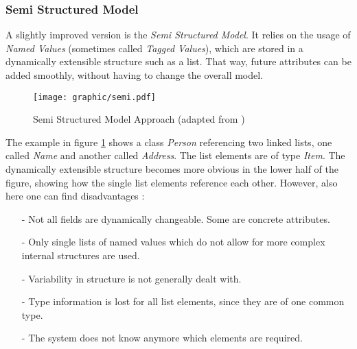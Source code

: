 %
%
%
%
%
%
%

\subsubsection{Semi Structured Model}
\label{semi_structured_model_heading}

A slightly improved version is the \emph{Semi Structured Model}. It relies on
the usage of \emph{Named Values} (sometimes called \emph{Tagged Values}), which
are stored in a dynamically extensible structure such as a list. That way,
future attributes can be added smoothly, without having to change the overall
model.

\begin{figure}[ht]
    \begin{center}
        \texttt{[image: graphic/semi.pdf]}
        \caption{Semi Structured Model Approach (adapted from \cite{archetypes})}
        \label{semi_figure}
    \end{center}
\end{figure}

The example in figure \ref{semi_figure} shows a class \emph{Person} referencing
two linked lists, one called \emph{Name} and another called \emph{Address}. The
list elements are of type \emph{Item}. The dynamically extensible structure
becomes more obvious in the lower half of the figure, showing how the single
list elements reference each other. However, also here one can find
disadvantages \cite{archetypes}:

\begin{itemize}
    \item[-] Not all fields are dynamically changeable. Some are concrete
        attributes.
    \item[-] Only single lists of named values which do not allow for more
        complex internal structures are used.
    \item[-] Variability in structure is not generally dealt with.
    \item[-] Type information is lost for all list elements, since they are of
        one common type.
    \item[-] The system does not know anymore which elements are required.
\end{itemize}

